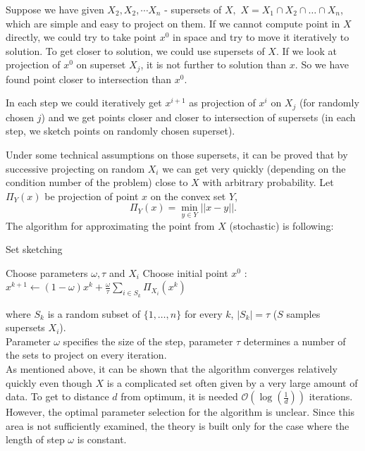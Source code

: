 \documentclass[11pt]{book}
\begin{document}
Suppose we have given $X_2 , X_2 , \cdots X_n$ - supersets of $X,$ $X=X_1 \cap X_2 \cap \dots \cap X_n$, which are simple and easy to project on them. If we cannot compute point in $X$ directly, we could try to take point $x^0$ in space and try to move it iteratively to solution. To get closer to solution, we could use supersets of $X$. If we look at projection of $x^0$ on superset $X_j$, it is not further to solution than $x$. So we have found point closer to intersection than $x^0$.

In each step we could iteratively get $x^{i+1}$ as projection of $x^i$ on $X_j$ (for randomly chosen $j$) and we get points closer and closer to intersection of supersets (in each step, we sketch points on randomly chosen superset).

Under some technical assumptions on those supersets, it can be proved that by successive projecting on random $X_i$ we can get very quickly (depending on the condition number of the problem) close to $X$ with arbitrary probability\cite{projectionFeasibility,kaczmarz}. Let $\Pi_Y(x)$ be projection of point $x$ on the convex set $Y$, $$\Pi_Y(x) = \min_{y \in Y} ||x-y||.$$ The algorithm for approximating the point from $X$ (stochastic) is following:

\begin{algorithm}[H]
	\caption{Set sketching \cite{projectionFeasibility,kaczmarz}}
	\label{alg:set sketch}
	\begin{algorithmic}[1]
		\State Choose parameters $\omega, \tau$ and $ X_i$
		\State Choose initial point $x^0$
		:
		\State $x^{k+1} \leftarrow (1 - \omega)x^k + \frac{\omega}{\tau}\sum_{i \in S_k} \Pi_{X_i}(x^k)$
		\EndFor
	\end{algorithmic}
\end{algorithm}

\noindent
where $S_k$ is a random subset of $\{ 1, \dots , n\}$ for every $k$, $|S_k|=\tau$ ($S$ samples supersets $X_i$).\\

Parameter $\omega$ specifies the size of the step, parameter $\tau$ determines a number of the sets to project on every iteration.\\

As mentioned above, it can be shown that the algorithm converges relatively quickly even though $X$ is a complicated set often given by a very large amount of data. To get to distance $d$ from optimum, it is needed $\mathcal{O} (\log(\frac{1}{d}))$ iterations\cite{sketchAndProject,kaczmarz}.  However, the optimal parameter selection for the algorithm is unclear. Since this area is not sufficiently examined, the theory is built only for the case where the length of step $\omega$ is constant.\\
\end{document}
